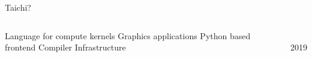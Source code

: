 \begin{frame}{Taichi?}
\begin{columns}
\centering
\begin{outline}
  \1 Language for compute kernels
    \2 Graphics applications 
  \1 Python based frontend
  \1 Compiler Infrastructure
\end{outline}
\centering
{} 

\\
2019 \cite{Hu2019}

\end{columns}
\end{frame}
